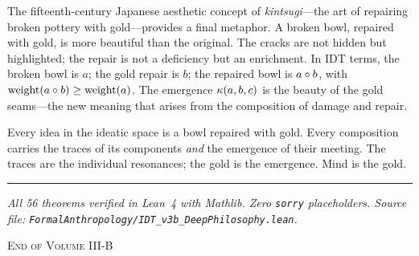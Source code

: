 \medskip

The fifteenth-century Japanese aesthetic concept of \textit{kintsugi}---the
art of repairing broken pottery with gold---provides a final metaphor.  A
broken bowl, repaired with gold, is more beautiful than the original.  The
cracks are not hidden but highlighted; the repair is not a deficiency but an
enrichment.  In IDT terms, the broken bowl is $a$; the gold repair is $b$;
the repaired bowl is $a \circ b$, with $\mathrm{weight}(a \circ b)
\geq \mathrm{weight}(a)$.  The emergence $\kappa(a, b, c)$ is the beauty
of the gold seams---the new meaning that arises from the composition of
damage and repair.

Every idea in the ideatic space is a bowl repaired with gold.  Every
composition carries the traces of its components \emph{and} the emergence of
their meeting.  The traces are the individual resonances; the gold is the
emergence.  Mind is the gold.

\begin{center}
\rule{0.5\textwidth}{0.4pt}
\end{center}

\noindent\textit{All 56 theorems verified in Lean~4 with Mathlib.  Zero
\texttt{sorry} placeholders.  Source file:
\texttt{FormalAnthropology/IDT\_v3b\_DeepPhilosophy.lean}.}

\vspace{1em}

\begin{center}
\textsc{End of Volume III-B}
\end{center}
